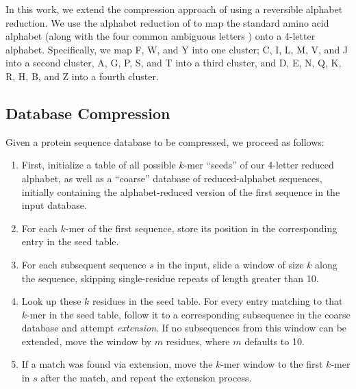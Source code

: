 \documentclass{amsbook}
\theoremstyle{definition}
\theoremstyle{remark}
\numberwithin{equation}{section}
\begin{document}
In this work, we extend the compression approach of \citet{Daniels:2013} using
a reversible alphabet reduction.
We use the alphabet reduction of \citet{Murphy:2000} to map the standard amino
acid alphabet (along with the four common ambiguous letters ) onto a 4-letter 
alphabet.
Specifically, we map F, W, and Y into one cluster; C, I, L, M, V, and J into
a second cluster, A, G, P, S, and T into a third cluster, and
D, E, N, Q, K, R, H, B, and Z into a fourth cluster.

\subsection*{Database Compression}

Given a protein sequence database to be compressed, we proceed as follows:
\begin{enumerate}
        \item First, initialize a table of all possible $k$-mer ``seeds'' of
        our 4-letter reduced alphabet, as well as a ``coarse'' database of
        reduced-alphabet sequences, initially containing the alphabet-reduced
        version of the first sequence in the input database.
        \item For each $k$-mer of the first sequence, store its position in the
        corresponding entry in the seed table.
        \item For each subsequent sequence $s$ in the input, slide a window of 
        size $k$ along the sequence, skipping single-residue repeats of length
        greater than 10.
        \item Look up these $k$ residues in the seed table.
        For every entry matching to that $k$-mer in the seed table, follow
        it to a corresponding subsequence in the coarse database and attempt
        \textit{extension}.
        If no subsequences from this window can be extended, move the window
        by $m$ residues, where $m$ defaults to 10.
        \item If a match was found via extension, move the $k$-mer window to
        the first $k$-mer in $s$ after the match, and repeat the extension
        process.
\end{enumerate}
        
\end{document}
